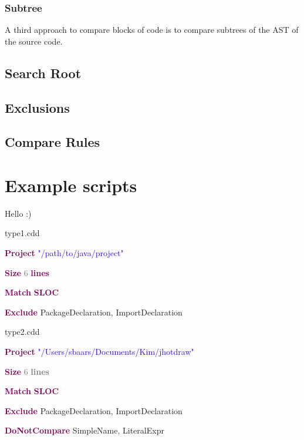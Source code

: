 \documentclass[sigplan,10pt,review,anonymous]{acmart}
\begin{document}
\subsubsection{Subtree}
A third approach to compare blocks of code is to compare subtrees of the AST of the source code.

\subsection{Search Root}

\subsection{Exclusions}

\subsection{Compare Rules}

\section{Example scripts}
Hello :)

\noindent\makebox[\linewidth]{\rule{\linewidth}{0.4pt}}
\noindent type1.cdd\par
\noindent\makebox[\linewidth]{\rule{\linewidth}{0.4pt}}
\noindent\textbf{\textcolor[HTML]{7F0055}{Project}} \textcolor[HTML]{2A00FF}{"/path/to/java/project"} \par
\noindent\textbf{\textcolor[HTML]{7F0055}{Size}} \textcolor[HTML]{7D7D7D}{6} \textbf{\textcolor[HTML]{7F0055}{lines}}  \par
\noindent\textbf{\textcolor[HTML]{7F0055}{Match}} \textbf{\textcolor[HTML]{7F0055}{SLOC}}  \par
\noindent\textbf{\textcolor[HTML]{7F0055}{Exclude}} PackageDeclaration, ImportDeclaration \\
\noindent\makebox[\linewidth]{\rule{\linewidth}{0.4pt}}

\noindent\makebox[\linewidth]{\rule{\linewidth}{0.4pt}}
\noindent type2.cdd\par
\noindent\makebox[\linewidth]{\rule{\linewidth}{0.4pt}}
\noindent\textbf{\textcolor[HTML]{7F0055}{Project}} \textcolor[HTML]{2A00FF}{"/Users/sbaars/Documents/Kim/jhotdraw"}\par
\noindent\textbf{\textcolor[HTML]{7F0055}{Size}} \textcolor[HTML]{7D7D7D}{6 \textbf{lines}}\par
\noindent\textbf{\textcolor[HTML]{7F0055}{Match}} \textbf{\textcolor[HTML]{7F0055}{SLOC}}\par
\noindent\textbf{\textcolor[HTML]{7F0055}{Exclude}} PackageDeclaration, ImportDeclaration\par
\noindent\textbf{\textcolor[HTML]{7F0055}{DoNotCompare}} SimpleName, LiteralExpr\par
\noindent\makebox[\linewidth]{\rule{\linewidth}{0.4pt}}
\end{document}
